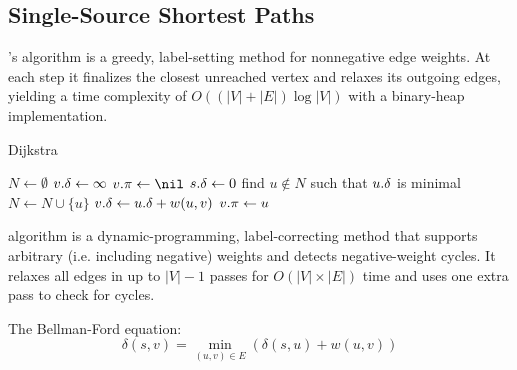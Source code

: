 \subsection{Single-Source Shortest Paths}\label{sec:single_source_shortest_paths}


's algorithm is a greedy, label-setting method for nonnegative edge weights.  
At each step it finalizes the closest unreached vertex and relaxes its outgoing edges, yielding a time complexity of \(O((|V|+|E|)\log |V|)\) with a binary-heap implementation.

\begin{algorithm}[h]
\caption{Dijkstra}\label{alg:dijkstra}
\begin{algorithmic}[1]
  \State $N \gets \emptyset$ 
    \State $v\mathtt{.}\mathtt{\delta}\gets\infty$ 
    \State $\attrib{v}{\pi}\gets\nil$ 
  \EndFor
  \State $s\mathtt{.}\mathtt{\delta}\gets 0$ 
   
    \State find \(u \notin N\) such that \(u\mathtt{.}\mathtt{\delta}\) is minimal
    \State $N\gets N\cup\{u\}$ 
        \State $v\mathtt{.}\mathtt{\delta} \gets u\mathtt{.}\mathtt{\delta} + w(u,v)$
        \State $v\mathtt{.}\mathtt{\pi} \gets u$
      \EndIf
    \EndFor
  \EndWhile
\EndFunction
\end{algorithmic}
\end{algorithm}






 algorithm is a dynamic-programming, label-correcting method that supports arbitrary (i.e. including negative) weights and detects negative-weight cycles.  
It relaxes all edges in up to \(|V|-1\) passes for \(O(|V|\times|E|)\) time and uses one extra pass to check for cycles.

The Bellman-Ford equation:
\begin{equation}\label{eq:bellmanford}
\delta(s, v) = \min_{(u,v)\in E} \left(\delta(s, u) + w(u, v)\right)
\end{equation}

